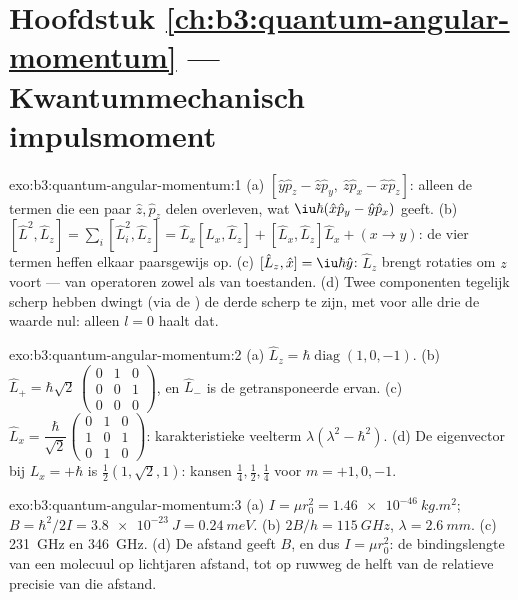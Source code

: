 \section*{Hoofdstuk \ref{ch:b3:quantum-angular-momentum} --- Kwantummechanisch impulsmoment}

\begin{solution}{exo:b3:quantum-angular-momentum:1}
(a) $[\hat y\hat p_z - \hat z\hat p_y,\ \hat z\hat p_x - \hat x\hat
p_z]$: alleen de termen die een paar $\hat z, \hat p_z$ delen overleven,
wat $\iu\hbar(\hat x\hat p_y - \hat y\hat p_x)$ geeft. (b) $[\hat
L^2, \hat L_z] = \sum_i[\hat L_i^2, \hat L_z] = \hat L_x[\hat L_x,
\hat L_z] + [\hat L_x, \hat L_z]\hat L_x + (x \to y)$: de vier termen
heffen elkaar paarsgewijs op. (c) $[\hat L_z, \hat x] = \iu\hbar\hat y$:
$\hat L_z$ brengt rotaties om $z$ voort --- van operatoren zowel als van
toestanden. (d) Twee componenten tegelijk scherp hebben dwingt (via de
) de derde scherp te zijn, met voor alle drie de waarde nul:
alleen $l = 0$ haalt dat.
\end{solution}

\begin{solution}{exo:b3:quantum-angular-momentum:2}
(a) $\hat L_z = \hbar\operatorname{diag}(1, 0, -1)$. (b) $\hat L_+ =
\hbar\sqrt2\,\begin{pmatrix}0&1&0\\0&0&1\\0&0&0
\end{pmatrix}$, en $\hat L_-$ is de getransponeerde ervan. (c) $\hat L_x =
\dfrac{\hbar}{\sqrt2}\begin{pmatrix}0&1&0\\1&0&1\\0&1&0
\end{pmatrix}$: karakteristieke veelterm $\lambda(\lambda^2 -
\hbar^2)$. (d) De eigenvector bij $L_x = +\hbar$ is $\tfrac12(1,
\sqrt2, 1)$: kansen $\tfrac14, \tfrac12, \tfrac14$ voor $m =
+1, 0, -1$.
\end{solution}

\begin{solution}{exo:b3:quantum-angular-momentum:3}
(a) $I = \mu r_0^2 = \qty{1.46e-46}{kg.m^2}$; $B = \hbar^2/2I =
\qty{3.8e-23}{J} = \qty{0.24}{meV}$. (b) $2B/h = \qty{115}{GHz}$,
$\lambda = \qty{2.6}{mm}$. (c) \qty{231}{GHz} en \qty{346}{GHz}.
(d) De afstand geeft $B$, en dus $I = \mu r_0^2$: de bindingslengte van
een molecuul op lichtjaren afstand, tot op ruwweg de helft van de
relatieve precisie van die afstand.
\end{solution}

